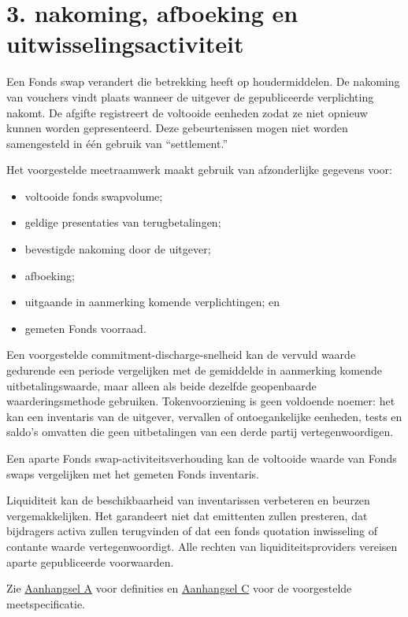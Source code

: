 \documentclass[11pt]{article}
\begin{document}
\section*{3. nakoming, afboeking en uitwisselingsactiviteit}

Een Fonds swap verandert die betrekking heeft op houdermiddelen. De nakoming van vouchers vindt plaats wanneer de uitgever de gepubliceerde verplichting nakomt. De afgifte registreert de voltooide eenheden zodat ze niet opnieuw kunnen worden gepresenteerd. Deze gebeurtenissen mogen niet worden samengesteld in één gebruik van ``settlement.''

Het voorgestelde meetraamwerk maakt gebruik van afzonderlijke gegevens voor:

\begin{itemize}[leftmargin=*]
\item voltooide fonds swapvolume;
\item geldige presentaties van terugbetalingen;
\item bevestigde nakoming door de uitgever;
\item afboeking;
\item uitgaande in aanmerking komende verplichtingen; en
\item gemeten Fonds voorraad.
\end{itemize}
Een voorgestelde commitment-discharge-snelheid kan de vervuld waarde gedurende een periode vergelijken met de gemiddelde in aanmerking komende uitbetalingswaarde, maar alleen als beide dezelfde geopenbaarde waarderingsmethode gebruiken. Tokenvoorziening is geen voldoende noemer: het kan een inventaris van de uitgever, vervallen of ontoegankelijke eenheden, tests en saldo's omvatten die geen uitbetalingen van een derde partij vertegenwoordigen.

Een aparte Fonds swap-activiteitsverhouding kan de voltooide waarde van Fonds swaps vergelijken met het gemeten Fonds inventaris.

Liquiditeit kan de beschikbaarheid van inventarissen verbeteren en beurzen vergemakkelijken. Het garandeert niet dat emittenten zullen presteren, dat bijdragers activa zullen terugvinden of dat een fonds quotation inwisseling of contante waarde vertegenwoordigt. Alle rechten van liquiditeitsproviders vereisen aparte gepubliceerde voorwaarden.

Zie \href{https://docs.cosmolocal.credit/nl-BE/white-paper/appendix-a-math-box}{Aanhangsel A} voor definities en \href{https://docs.cosmolocal.credit/nl-BE/white-paper/appendix-c-kpi-definitions}{Aanhangsel C} voor de voorgestelde meetspecificatie.
\end{document}
